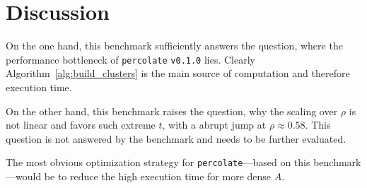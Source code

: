 \documentclass[twoside,11pt]{article}
\def\perc{\texttt{perco\-late}}
\def\v{\texttt{v0.1.0}}
\begin{document}

\section{Discussion} %

On the one hand, this benchmark sufficiently answers the
question, where the performance bottleneck of \perc{} \v{}
lies.
Clearly Algorithm~\ref{alg:build_clusters} is the main
source of computation and therefore execution time.

On the other hand, this benchmark raises the question, why
the scaling over $\rho$ is not linear and favors such
extreme $t$, with a abrupt jump at $\rho \approx 0.58$.
This question is not answered by the benchmark and needs to
be further evaluated.

The most obvious optimization strategy for \perc{}---based
on this benchmark---would be to reduce the high execution
time for more dense $A$.
\end{document}
